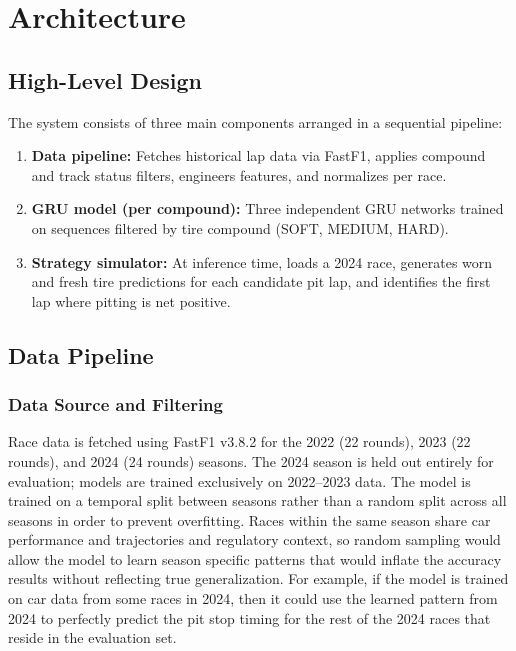 \section{Architecture}\label{sec:architecture}

\subsection{High-Level Design}

The system consists of three main components arranged in a sequential pipeline:

\begin{enumerate}[noitemsep]
    \item \textbf{Data pipeline:} Fetches historical lap data via FastF1, applies compound and track status filters, engineers features, and normalizes per race.
    \item \textbf{GRU model (per compound):} Three independent GRU networks trained on sequences filtered by tire compound (SOFT, MEDIUM, HARD).
    \item \textbf{Strategy simulator:} At inference time, loads a 2024 race, generates worn and fresh tire predictions for each candidate pit lap, and identifies the first lap where pitting is net positive.
\end{enumerate}

\subsection{Data Pipeline}

\subsubsection{Data Source and Filtering}

Race data is fetched using FastF1 v3.8.2 for the 2022 (22 rounds), 2023 (22 rounds), and 2024 (24 rounds) seasons. The 2024 season is held out 
entirely for evaluation; models are trained exclusively on 2022--2023 data. The model is trained on a temporal split between seasons rather than a random split across all seasons in order to prevent overfitting.
Races within the same season share car performance and trajectories and regulatory context, so random sampling would allow the model to learn season specific patterns that would inflate the accuracy results without reflecting true generalization.
For example, if the model is trained on car data from some races in 2024, then it could use the learned pattern from 2024 to perfectly predict
 the pit stop timing for the rest of the 2024 races that reside in the evaluation set.

